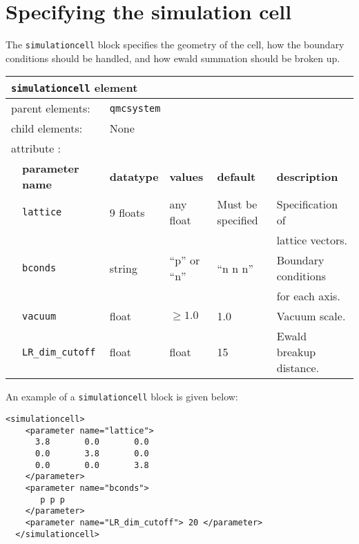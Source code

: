 \section{Specifying the simulation cell}
\label{chap:simulationcell}

The \texttt{simulationcell} block specifies the geometry of the cell, how the boundary conditions should be handled, and how ewald summation should be broken up.

\begin{table}[h]
\begin{center}
\begin{tabularx}{\textwidth}{l l l l l l }
\hline
\multicolumn{6}{l}{\texttt{simulationcell} element} \\
\hline
\multicolumn{2}{l}{parent elements:} & \multicolumn{4}{l}{\texttt{qmcsystem}}\\
\multicolumn{2}{l}{child  elements:} & \multicolumn{4}{l}{None}\\
\multicolumn{2}{l}{attribute      :} & \multicolumn{4}{l}{}\\
   &   \bfseries parameter name            & \bfseries datatype & \bfseries values & \bfseries default   & \bfseries description \\
\hline
   &   \texttt{lattice}  & 9 floats & any float & Must be specified & Specification of \\
   &                     &        &             &                   & lattice vectors. \\
   &   \texttt{bconds}   & string & ``p'' or ``n''  & ``n n n'' & Boundary conditions \\
   &                     &        &             &           & for each axis. \\
   &   \texttt{vacuum} & float & $\ge 1.0$ & 1.0        & Vacuum scale. \\
   &   \texttt{LR\_dim\_cutoff} & float & float & 15        & Ewald breakup distance. \\
\hline
\end{tabularx}
\end{center}
\end{table}

An example of a \texttt{simulationcell} block is given below:
\begin{lstlisting}[style=XML]
  <simulationcell>
    <parameter name="lattice">
      3.8       0.0       0.0
      0.0       3.8       0.0
      0.0       0.0       3.8
    </parameter>
    <parameter name="bconds">
       p p p
    </parameter>
    <parameter name="LR_dim_cutoff"> 20 </parameter>
  </simulationcell>
\end{lstlisting}

